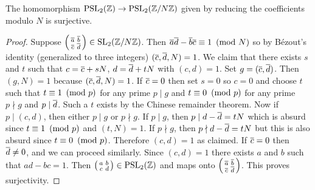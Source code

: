    \begin{proposition}\label{prop:surjective_modulo_N_for_modular_group}
      The homomorphism $\mathrm{PSL}_{2}(\mathbb{Z}) \to \mathrm{PSL}_{2}(\mathbb{Z}/N\mathbb{Z})$ given by reducing the coefficients modulo $N$ is surjective.
    \end{proposition}
    \begin{proof}
      Suppose $\begin{psmallmatrix} \overline{a} & \overline{b} \\ \overline{c} & \overline{d} \end{psmallmatrix} \in \mathrm{SL}_{2}(\mathbb{Z}/N\mathbb{Z})$. Then $\overline{a}\overline{d}-\overline{b}\overline{c} \equiv 1 \ \left(\text{mod }N\right)$ so by B\'ezout's identity (generalized to three integers) $(\overline{c},\overline{d},N) = 1$. We claim that there exists $s$ and $t$ such that $c = \overline{c}+sN$, $d = \overline{d}+tN$ with $(c,d) = 1$. Set $g = (\overline{c},\overline{d})$. Then $(g,N) = 1$ because $(\overline{c},\overline{d},N) = 1$. If $\overline{c} = 0$ then set $s = 0$ so $c = 0$ and choose $t$ such that $t \equiv 1 \ \left(\text{mod }p\right)$ for any prime $p \mid g$ and $t \equiv 0 \ \left(\text{mod }p\right)$ for any prime $p \nmid g$ and $p \mid \overline{d}$. Such a $t$ exists by the Chinese remainder theorem. Now if $p \mid (c,d)$, then either $p \mid g$ or $p \nmid g$. If $p \mid g$, then $p \mid d-\overline{d} = tN$ which is absurd since $t \equiv 1 \ \left(\text{mod }p\right)$ and $(t,N) = 1$. If $p \nmid g$, then $p \nmid d-\overline{d} = tN$ but this is also absurd since $t \equiv 0 \ \left(\text{mod }p\right)$. Therefore $(c,d) = 1$ as claimed. If $\overline{c} = 0$ then $\overline{d} \neq 0$, and we can proceed similarly. Since $(c,d) = 1$ there exists $a$ and $b$ such that $ad-bc = 1$. Then $\begin{psmallmatrix} a & b \\ c & d \end{psmallmatrix} \in \mathrm{PSL}_{2}(\mathbb{Z})$ and maps onto $\begin{psmallmatrix} \overline{a} & \overline{b} \\ \overline{c} & \overline{d} \end{psmallmatrix}$. This proves surjectivity.
    \end{proof}
    
